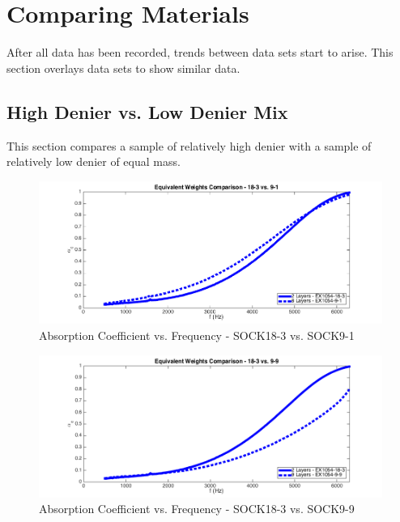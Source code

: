 \section{Comparing Materials}
After all data has been recorded, trends between data sets start to arise. This section overlays data sets to show similar data. 

\subsection{High Denier vs. Low Denier Mix}
This section compares a sample of relatively high denier with a sample of relatively low denier of equal mass.

\begin{figure}[hbtp]
    \centering
    \includegraphics[width=1\textwidth]{Chapter-4/figs/AfigSOCK18-3compareSOCK9-1}
    \caption{Absorption Coefficient vs. Frequency - SOCK18-3 vs. SOCK9-1}
    \label{fig:AfigSOCK18-3compareSOCK9-1}
\end{figure}

\begin{figure}[hbtp]
    \centering
    \includegraphics[width=1\textwidth]{Chapter-4/figs/AfigSOCK18-3compareSOCK9-9}
    \caption{Absorption Coefficient vs. Frequency - SOCK18-3 vs. SOCK9-9}
    \label{fig:AfigSOCK18-3compareSOCK9-9}
\end{figure}

